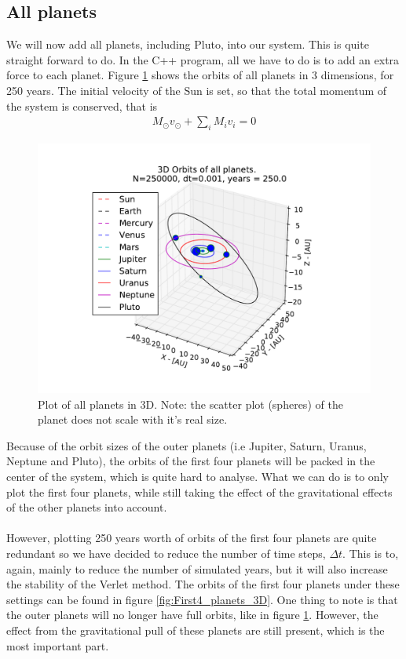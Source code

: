 \documentclass{article}
\begin{document}
\subsection{All planets}
We will now add all planets, including Pluto, into our system. This is quite straight forward to do. In the C++ program, all we have to do is to add an extra force to each planet. Figure \ref{fig:All_planets_3D} shows the orbits of all planets in 3 dimensions, for 250 years. The initial velocity of the Sun is set, so that the total momentum of the system is conserved, that is
\begin{align}
M_{\odot}v_{\odot} + \displaystyle \sum_i M_i v_i = 0
\end{align}
\begin{figure}[!h]
\centering
\includegraphics[width=\linewidth]{Plots/All_planets_3D_plot.pdf}
\caption{Plot of all planets in 3D. Note: the scatter plot (spheres) of the planet does not scale with it's real size.}
\label{fig:All_planets_3D}
\end{figure}
Because of the orbit sizes of the outer planets (i.e Jupiter, Saturn, Uranus, Neptune and Pluto), the orbits of the first four planets will be packed in the center of the system, which is quite hard to analyse. What we can do is to only plot the first four planets, while still taking the effect of the gravitational effects of the other planets into account. \\\\
However, plotting 250 years worth of orbits of the first four planets are quite redundant so we have decided to reduce the number of time steps, $\Delta t$. This is to, again, mainly to reduce the number of simulated years, but it will also increase the stability of the Verlet method. The orbits of the first four planets under these settings can be found in figure \ref{fig:First4_planets_3D}. One thing to note is that the outer planets will no longer have full orbits, like in figure \ref{fig:All_planets_3D}. However, the effect from the gravitational pull of these planets are still present, which is the most important part. \\
\end{document}
